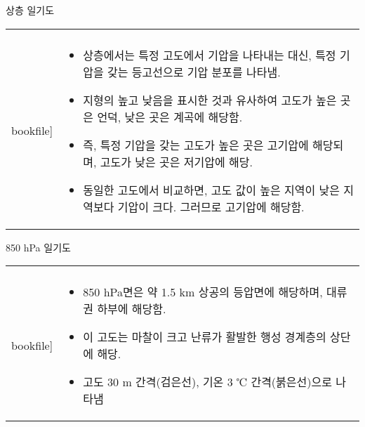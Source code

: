 \begin{frame}[t]{상층 일기도}
	\begin{tabular}{ll}
		\begin{minipage}[t]{0.3\textwidth}\scriptsize
			\begin{figure}[t]
				\texttt{[image: \\bookfile]}
			\end{figure}
		\end{minipage}	
		&
		\begin{minipage}[t]{0.65\textwidth} \scriptsize	
			\begin{itemize}
				\item 상층에서는 특정 고도에서 기압을 나타내는 대신, 특정 기압을 갖는 등고선으로 기압 분포를 나타냄. 
				\item 지형의 높고 낮음을 표시한 것과 유사하여 고도가 높은 곳은 언덕, 낮은 곳은 계곡에 해당함.
				\item 즉, 특정 기압을 갖는 고도가 높은 곳은 고기압에 해당되며, 고도가 낮은 곳은 저기압에 해당.
				\item 동일한 고도에서 비교하면, 고도 값이 높은 지역이 낮은 지역보다 기압이 크다. 그러므로 고기압에 해당함.
					
			\end{itemize}

		\end{minipage}
	\end{tabular}
\end{frame}



\begin{frame}[t]{850 hPa 일기도}
	\begin{tabular}{ll}
		\begin{minipage}[t]{0.5\textwidth}\scriptsize
			\begin{figure}[t]
				\texttt{[image: \\bookfile]}
			\end{figure}
		\end{minipage}	
		&
		\begin{minipage}[t]{0.45\textwidth} \scriptsize	
			\begin{itemize}\scriptsize
				\item 850 hPa면은 약 1.5 km 상공의 등압면에 해당하며, 대류권 하부에 해당함.
				\item 이 고도는 마찰이 크고 난류가 활발한 행성 경계층의 상단에 해당.
				\item 고도 30 m 간격(검은선), 기온 3 ℃ 간격(붉은선)으로 나타냄				
			\end{itemize}
		\end{minipage}
	\end{tabular}
\end{frame}



